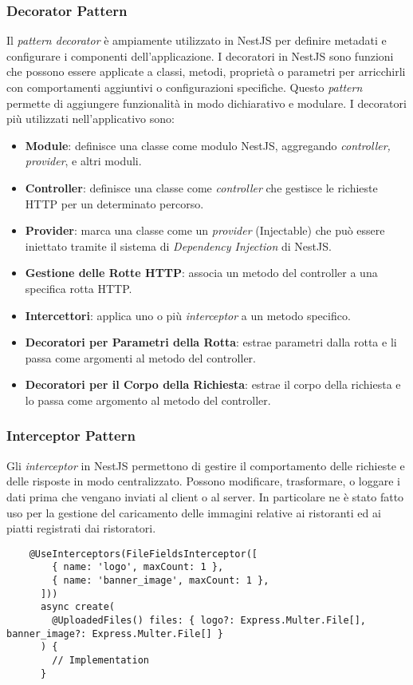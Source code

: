 \subsubsection{Decorator Pattern}
Il \textit{pattern decorator} è ampiamente utilizzato in NestJS per definire metadati e configurare i componenti dell'applicazione. 
I decoratori in NestJS sono funzioni che possono essere applicate a classi, metodi, proprietà o parametri per arricchirli con comportamenti aggiuntivi o configurazioni specifiche. 
Questo \textit{pattern} permette di aggiungere funzionalità in modo dichiarativo e modulare.
I decoratori più utilizzati nell'applicativo sono:
\begin{itemize}
	\item \textbf{Module}: definisce una classe come modulo NestJS, aggregando \textit{controller, provider}, e altri moduli.
	\item \textbf{Controller}: definisce una classe come \textit{controller} che gestisce le richieste HTTP per un determinato percorso.
	\item \textbf{Provider}: marca una classe come un \textit{provider} (Injectable) che può essere iniettato tramite il sistema di \textit{Dependency Injection} di NestJS.
	\item \textbf{Gestione delle Rotte HTTP}: associa un metodo del controller a una specifica rotta HTTP.
	\item \textbf{Intercettori}: applica uno o più \textit{interceptor} a un metodo specifico.
	\item \textbf{Decoratori per Parametri della Rotta}: estrae parametri dalla rotta e li passa come argomenti al metodo del controller.
	\item \textbf{Decoratori per il Corpo della Richiesta}: estrae il corpo della richiesta e lo passa come argomento al metodo del controller.
\end{itemize}


\subsubsection{Interceptor Pattern}
Gli \textit{interceptor} in NestJS permettono di gestire il comportamento delle richieste e delle risposte in modo centralizzato. 
Possono modificare, trasformare, o loggare i dati prima che vengano inviati al client o al server.
In particolare ne è stato fatto uso per la gestione del caricamento delle immagini relative ai ristoranti ed ai piatti registrati dai ristoratori.
\begin{lstlisting}
	@UseInterceptors(FileFieldsInterceptor([
		{ name: 'logo', maxCount: 1 },
		{ name: 'banner_image', maxCount: 1 },
	  ]))
	  async create(
		@UploadedFiles() files: { logo?: Express.Multer.File[], banner_image?: Express.Multer.File[] }
	  ) {
		// Implementation
	  }
\end{lstlisting}
